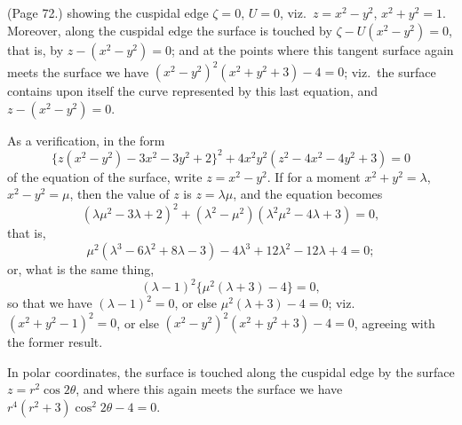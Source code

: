 \documentclass[11pt,a4paper]{article}
\begin{document}
\noindent (Page 72.) showing the cuspidal edge $\zeta = 0$, $U = 0$, viz.\ $z = x^2 - y^2$, $x^2 + y^2 = 1$. Moreover, along the cuspidal edge the surface is touched by $\zeta - U(x^2 - y^2) = 0$, that is, by $z - (x^2 - y^2) = 0$; and at the points where this tangent surface again meets the surface we have $(x^2 - y^2)^2 (x^2 + y^2 + 3) - 4 = 0$; viz.\ the surface contains upon itself the curve represented by this last equation, and $z - (x^2 - y^2) = 0$.

As a verification, in the form
\[
\{z(x^2 - y^2) - 3x^2 - 3y^2 + 2\}^2 + 4x^2 y^2 (z^2 - 4x^2 - 4y^2 + 3) = 0
\]
of the equation of the surface, write $z = x^2 - y^2$. If for a moment $x^2 + y^2 = \lambda$, $x^2 - y^2 = \mu$, then the value of $z$ is $z = \lambda\mu$, and the equation becomes
\[
(\lambda\mu^2 - 3\lambda + 2)^2 + (\lambda^2 - \mu^2)(\lambda^2 \mu^2 - 4\lambda + 3) = 0,
\]
that is,
\[
\mu^2 (\lambda^3 - 6\lambda^2 + 8\lambda - 3) - 4\lambda^3 + 12\lambda^2 - 12\lambda + 4 = 0;
\]
or, what is the same thing,
\[
(\lambda - 1)^2 \{\mu^2 (\lambda + 3) - 4\} = 0,
\]
so that we have $(\lambda - 1)^2 = 0$, or else $\mu^2 (\lambda + 3) - 4 = 0$; viz.\ $(x^2 + y^2 - 1)^2 = 0$, or else $(x^2 - y^2)^2 (x^2 + y^2 + 3) - 4 = 0$, agreeing with the former result.

In polar coordinates, the surface is touched along the cuspidal edge by the surface $z = r^2 \cos 2\theta$, and where this again meets the surface we have $r^4 (r^2 + 3)\cos^2 2\theta - 4 = 0$.
\end{document}
